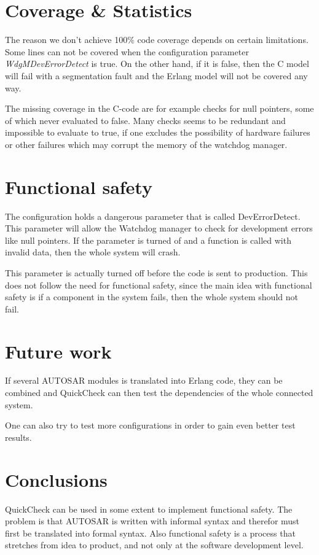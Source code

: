 \documentclass[a4paper]{article}
\begin{document}
\section{Coverage \& Statistics}
The reason we don't achieve 100\% code coverage depends on certain limitations.
Some lines can not be covered when the configuration parameter
\emph{WdgMDevErrorDetect} is true. On the other hand, if it is
false, then the C model will fail with a segmentation fault and the
Erlang model will not be covered any way.

The missing coverage in the C-code are for example checks for null
pointers, some of which never evaluated to false. Many checks seems to be
redundant and impossible to evaluate to true, if one excludes the possibility
of hardware failures or other failures which may corrupt the memory of the
watchdog manager.

\section{Functional safety}
The configuration holds a dangerous parameter that is called
DevErrorDetect. This parameter will allow the Watchdog manager to
check for development errors like null pointers. If the parameter is
turned of and a function is called with invalid data, then the whole
system will crash.

This parameter is actually turned off before the code is sent to
production. This does not follow the need for functional safety, since
the main idea with functional safety is if a component in the system
fails, then the whole system should not fail.

\section{Future work}
If several AUTOSAR modules is translated into Erlang code, they can be
combined and QuickCheck can then test the dependencies of the whole
connected system.

One can also try to test more configurations in order to gain even
better test results.

\section{Conclusions}
QuickCheck can be used in some extent to implement functional
safety. The problem is that AUTOSAR is written with informal syntax
and therefor must first be translated into formal syntax. Also
functional safety is a process that stretches from idea to product,
and not only at the software development level.
\end{document}
